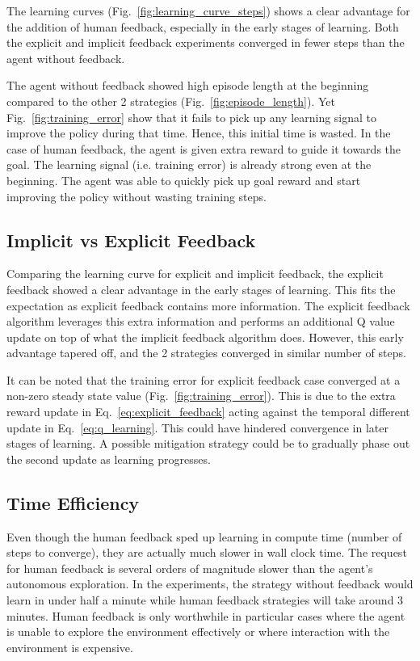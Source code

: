 \documentclass[conference]{IEEEtran}
\begin{document}
The learning curves (Fig.~\ref{fig:learning_curve_steps}) shows a clear advantage for the addition of human feedback, especially in the early stages of learning. Both the explicit and implicit feedback experiments converged in fewer steps than the agent without feedback.

The agent without feedback showed high episode length at the beginning compared to the other 2 strategies (Fig.~\ref{fig:episode_length}). Yet Fig.~\ref{fig:training_error} show that it fails to pick up any learning signal to improve the policy during that time. Hence, this initial time is wasted. In the case of human feedback, the agent is given extra reward to guide it towards the goal. The learning signal (i.e. training error) is already strong even at the beginning. The agent was able to quickly pick up goal reward and start improving the policy without wasting training steps.

\subsection{Implicit vs Explicit Feedback}

Comparing the learning curve for explicit and implicit feedback, the explicit feedback showed a clear advantage in the early stages of learning. This fits the expectation as explicit feedback contains more information. The explicit feedback algorithm leverages this extra information and performs an additional Q value update on top of what the implicit feedback algorithm does.
However, this early advantage tapered off, and the 2 strategies converged in similar number of steps.

It can be noted that the training error for explicit feedback case converged at a non-zero steady state value (Fig.~\ref{fig:training_error}). This is due to the extra reward update in Eq.~\ref{eq:explicit_feedback} acting against the temporal different update in Eq.~\ref{eq:q_learning}. This could have hindered convergence in later stages of learning. A possible mitigation strategy could be to gradually phase out the second update as learning progresses.

\subsection{Time Efficiency}

Even though the human feedback sped up learning in compute time (number of steps to converge), they are actually much slower in wall clock time. The request for human feedback is several orders of magnitude slower than the agent's autonomous exploration. In the experiments, the strategy without feedback would learn in under half a minute while human feedback strategies will take around 3 minutes. Human feedback is only worthwhile in particular cases where the agent is unable to explore the environment effectively or where interaction with the environment is expensive.
\end{document}
